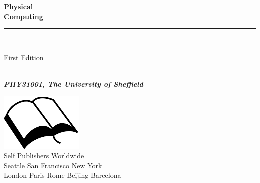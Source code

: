 \documentclass{book}
\makeatletter
\newcommand{\booksubtitle}{The Principles of Computing for Physicists}
\newcommand{\authorsubtitle}{PHY31001, The University of Sheffield}
\newcommand{\bookauthor}{\@author}
\makeatother
\begin{document}
\begin{titlepage}
\begin{flushleft}

\textbf{\fontsize{48}{54}\selectfont Physical\\Computing\\}

\par\noindent\rule{\textwidth}{4pt}\\


\begin{flushright}
\Large First Edition
\end{flushright}

\vspace{\fill}

\textbf{\large \bookauthor}\\[3.5pt]
\textbf{\large \textit{\authorsubtitle}}

\vspace{\fill}

\begin{center}
\includegraphics{booksvg.pdf}\\[4pt]
\small{Self Publishers Worldwide\\
Seattle San Francisco New York\\
London Paris Rome Beijing Barcelona}
\end{center}

\end{flushleft}
\end{titlepage}
\restoregeometry
\end{document}
